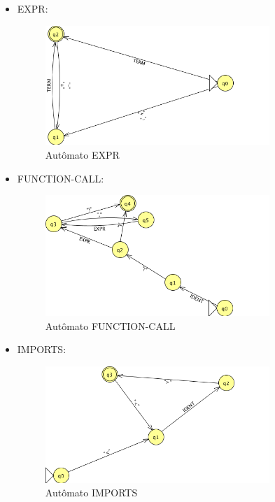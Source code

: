 \begin{itemize}
	\item EXPR:
	\begin{figure}[H]
		\centering 
		\includegraphics[width=0.8\textwidth]{images/submaquinas/EXPR.png}  
		\caption{Autômato EXPR}
	\end{figure}
	
	\item FUNCTION-CALL:
	\begin{figure}[H]
		\centering 
		\includegraphics[width=0.8\textwidth]{images/submaquinas/FUNCTION-CALL.png}  
		\caption{Autômato FUNCTION-CALL}
	\end{figure}
	
	\item IMPORTS:
	\begin{figure}[H]
		\centering 
		\includegraphics[width=0.8\textwidth]{images/submaquinas/IMPORTS.png}  
		\caption{Autômato IMPORTS}
	\end{figure}
	

\end{itemize}
